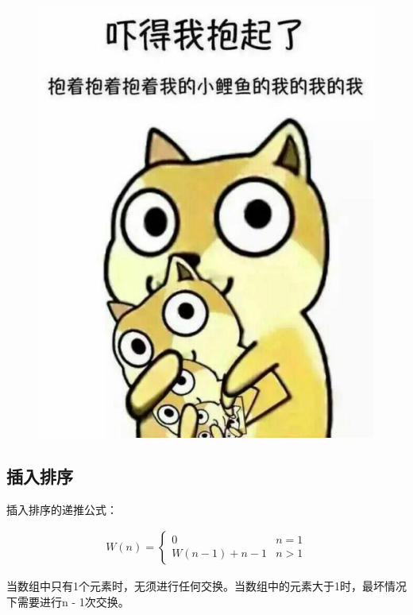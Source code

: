 \begin{figure}[H]
	\centering
	\includegraphics[]{img/C11/11-3/2.png}
\end{figure}

\vspace{0.5cm}

\subsection{插入排序}

插入排序的递推公式：

\vspace{-0.5cm}

\begin{align*}
	W(n) = \begin{cases}
		0                & n = 1 \\
		W(n - 1) + n - 1 & n > 1
	\end{cases}
\end{align*}

当数组中只有1个元素时，无须进行任何交换。当数组中的元素大于1时，最坏情况下需要进行n - 1次交换。

\vspace{-1cm}

